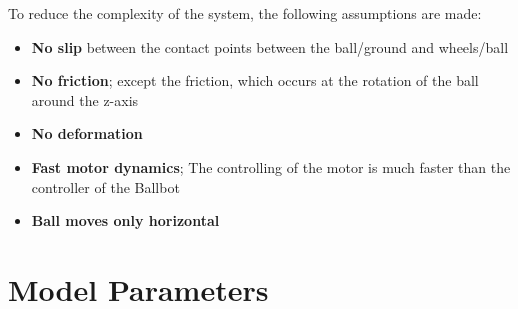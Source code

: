 \documentclass[twoside,colorback,accentcolor=tud4c,11pt]{tudreport}
\begin{document}
	To reduce the complexity of the system, the following assumptions are made: 
	
	\begin{itemize}
		\item \textbf{No slip} between the contact points between the ball/ground and wheels/ball
		\item \textbf{No friction}; except the friction, which occurs at the rotation of the ball around the z-axis
		\item \textbf{No deformation}
		\item \textbf{Fast motor dynamics}; The controlling of the motor is much faster than the controller of the Ballbot
		\item \textbf{Ball moves only horizontal}
	\end{itemize}
	
	\section{Model Parameters}
	
\end{document}

